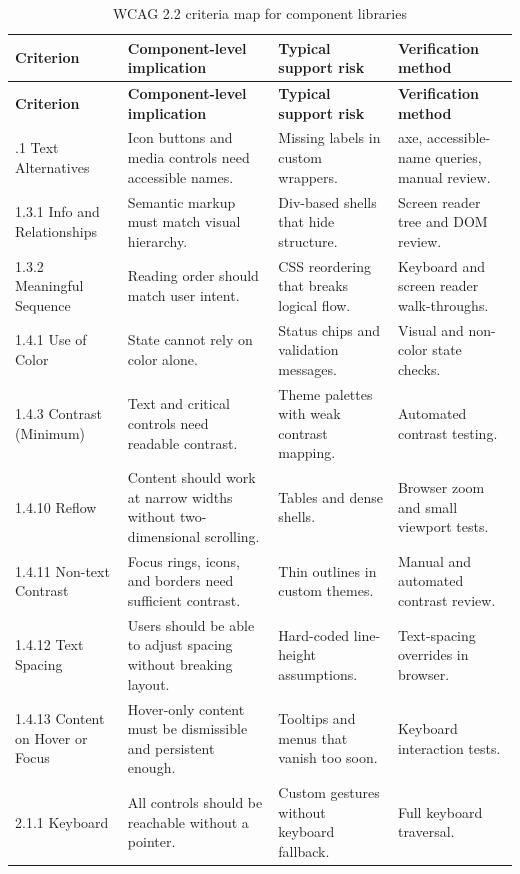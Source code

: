 \begin{longtable}{@{}p{}p{}p{}p{}@{}}
\caption{WCAG 2.2 criteria map for component libraries}\label{tab:wcag-map}\\
\toprule
\textbf{Criterion} & \textbf{Component-level implication} & \textbf{Typical support risk} & \textbf{Verification method} \\
\midrule
\endfirsthead
\toprule
\textbf{Criterion} & \textbf{Component-level implication} & \textbf{Typical support risk} & \textbf{Verification method} \\
\midrule
\endhead
\bottomrule
\endfoot
1.1.1 Text Alternatives & Icon buttons and media controls need accessible names. & Missing labels in custom wrappers. & axe, accessible-name queries, manual review. \\
1.3.1 Info and Relationships & Semantic markup must match visual hierarchy. & Div-based shells that hide structure. & Screen reader tree and DOM review. \\
1.3.2 Meaningful Sequence & Reading order should match user intent. & CSS reordering that breaks logical flow. & Keyboard and screen reader walk-throughs. \\
1.4.1 Use of Color & State cannot rely on color alone. & Status chips and validation messages. & Visual and non-color state checks. \\
1.4.3 Contrast (Minimum) & Text and critical controls need readable contrast. & Theme palettes with weak contrast mapping. & Automated contrast testing. \\
1.4.10 Reflow & Content should work at narrow widths without two-dimensional scrolling. & Tables and dense shells. & Browser zoom and small viewport tests. \\
1.4.11 Non-text Contrast & Focus rings, icons, and borders need sufficient contrast. & Thin outlines in custom themes. & Manual and automated contrast review. \\
1.4.12 Text Spacing & Users should be able to adjust spacing without breaking layout. & Hard-coded line-height assumptions. & Text-spacing overrides in browser. \\
1.4.13 Content on Hover or Focus & Hover-only content must be dismissible and persistent enough. & Tooltips and menus that vanish too soon. & Keyboard interaction tests. \\
2.1.1 Keyboard & All controls should be reachable without a pointer. & Custom gestures without keyboard fallback. & Full keyboard traversal. \\

\end{longtable}

